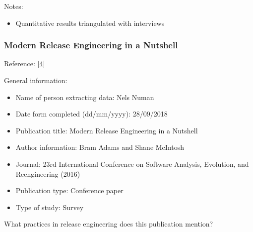 \documentclass[]{book}
\providecommand{\tightlist}{%
  \setlength{\itemsep}{0pt}\setlength{\parskip}{0pt}}
\begin{document}
Notes:

\begin{itemize}
\tightlist
\item
  Quantitative results triangulated with interviews
\end{itemize}

\subsubsection{Modern Release Engineering in a
Nutshell}\label{modern-release-engineering-in-a-nutshell}

Reference: {[}\protect\hyperlink{ref-adams2016a}{4}{]}

General information:

\begin{itemize}
\tightlist
\item
  Name of person extracting data: Nels Numan
\item
  Date form completed (dd/mm/yyyy): 28/09/2018
\item
  Publication title: Modern Release Engineering in a Nutshell
\item
  Author information: Bram Adams and Shane McIntosh
\item
  Journal: 23rd International Conference on Software Analysis,
  Evolution, and Reengineering (2016)
\item
  Publication type: Conference paper
\item
  Type of study: Survey
\end{itemize}

What practices in release engineering does this publication mention?
\end{document}
